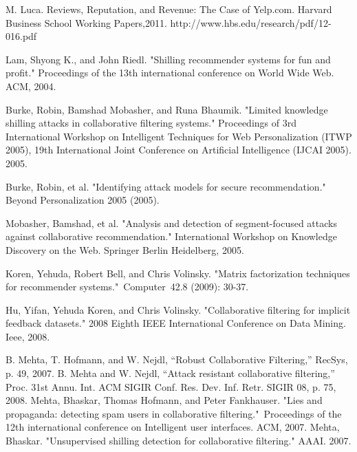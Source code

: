\documentclass[master,english,final]{kaist-ucs}
\begin{document}
\begin{thebibliography}{00}

 M. Luca. Reviews, Reputation, and Revenue: The Case of Yelp.com. Harvard Business School Working Papers,2011. http://www.hbs.edu/research/pdf/12-016.pdf

 Lam, Shyong K., and John Riedl. "Shilling recommender systems for fun and profit." Proceedings of the 13th international conference on World Wide Web. ACM, 2004.

 Burke, Robin, Bamshad Mobasher, and Runa Bhaumik. "Limited knowledge shilling attacks in collaborative filtering systems." Proceedings of 3rd International Workshop on Intelligent Techniques for Web Personalization (ITWP 2005), 19th International Joint Conference on Artificial Intelligence (IJCAI 2005). 2005.

 Burke, Robin, et al. "Identifying attack models for secure recommendation." Beyond Personalization 2005 (2005).

 Mobasher, Bamshad, et al. "Analysis and detection of segment-focused attacks against collaborative recommendation." International Workshop on Knowledge Discovery on the Web. Springer Berlin Heidelberg, 2005.

 Koren, Yehuda, Robert Bell, and Chris Volinsky. "Matrix factorization techniques for recommender systems." Computer 42.8 (2009): 30-37.

 Hu, Yifan, Yehuda Koren, and Chris Volinsky. "Collaborative filtering for implicit feedback datasets." 2008 Eighth IEEE International Conference on Data Mining. Ieee, 2008.

 B. Mehta, T. Hofmann, and W. Nejdl, “Robust Collaborative Filtering,” RecSys, p. 49, 2007.
 B. Mehta and W. Nejdl, “Attack resistant collaborative filtering,” Proc. 31st Annu. Int. ACM SIGIR Conf. Res. Dev. Inf. Retr. SIGIR 08, p. 75, 2008.
 Mehta, Bhaskar, Thomas Hofmann, and Peter Fankhauser. "Lies and propaganda: detecting spam users in collaborative filtering." Proceedings of the 12th international conference on Intelligent user interfaces. ACM, 2007.
 Mehta, Bhaskar. "Unsupervised shilling detection for collaborative filtering." AAAI. 2007.


\end{thebibliography}
\end{document}
